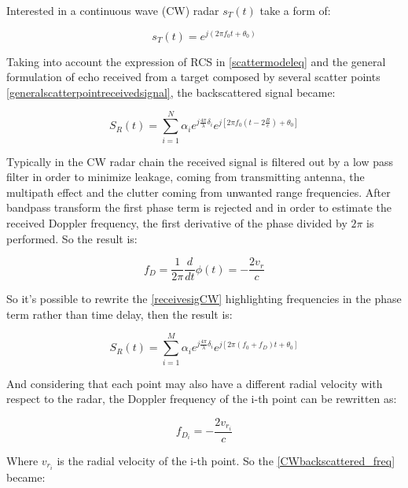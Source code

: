     
Interested in a continuous wave (CW) radar $s_{T}(t)$ take a form of:

\begin{equation}
s_{T}(t)=e^{j\left(2 \pi f_{0} t+\theta_{0}\right)}
\end{equation}

Taking into account the expression of RCS in \ref{scattermodeleq} and the general formulation of echo received from a target composed by several scatter points \ref{generalscatterpointreceivedsignal}, the backscattered signal became:

\begin{equation}
S_{R}(t)=\sum_{i=1}^{N} \alpha_{i} e^{j \frac{4 \pi}{\lambda} \delta_{i}} e^{j\left[2 \pi f_{0}\left(t-2 \frac{R}{c}\right)+\theta_{0}\right]}
\label{receivesigCW}
\end{equation}

Typically in the CW radar chain the received signal is filtered out by a low pass filter in order to minimize leakage, coming from transmitting antenna, the multipath effect and the clutter coming from unwanted range frequencies. After bandpass transform the first phase term is rejected and in order to estimate the received Doppler frequency, the first derivative of the phase divided by $2\pi$ is performed. So the result is:

\begin{equation}
f_{D}=\frac{1}{2 \pi} \frac{d}{d t} \phi(t)=-\frac{2 v_{r}}{c}
\end{equation}

So it's possible to rewrite the \ref{receivesigCW} highlighting frequencies in the phase term rather than time delay, then the result is:

\begin{equation}
S_{R}(t)=\sum_{i=1}^{M} \alpha_{i} e^{j \frac{4 \pi}{\lambda} \delta_{i}} e^{j\left[2 \pi\left(f_{0}+f_{D}\right) t+\theta_{0}\right]}
\label{CWbackscattered_freq}
\end{equation}



And considering that each point may also have a different radial velocity with respect to the radar, the Doppler frequency of the i-th point can be rewritten as:

\begin{equation}
f_{D_{i}} = -\frac{2 v_{r_{i}}}{c}
\end{equation}

Where $ v_{r_{i}} $ is the radial velocity of the i-th point. So the \ref{CWbackscattered_freq} became:

